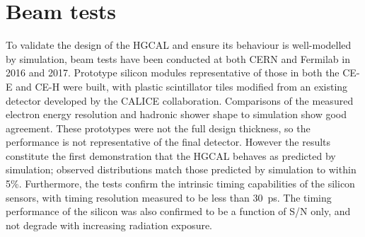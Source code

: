 \section{Beam tests}

To validate the design of the HGCAL and ensure its behaviour is well-modelled by simulation, beam tests have been conducted at both CERN and Fermilab in 2016 and 2017. 
Prototype silicon modules representative of those in both the CE-E and CE-H were built, with plastic scintillator tiles modified from an existing detector developed by the CALICE collaboration.
Comparisons of the measured electron energy resolution and hadronic shower shape to simulation show good agreement.
These prototypes were not the full design thickness, so the performance is not representative of the final detector.
However the results constitute the first demonstration that the HGCAL behaves as predicted by simulation; observed distributions match those predicted by simulation to within 5\%. 
Furthermore, the tests confirm the intrinsic timing capabilities of the silicon sensors, with timing resolution measured to be less than \SI{30}{\pico\second}.
The timing performance of the silicon was also confirmed to be a function of S/N only, and not degrade with increasing radiation exposure. 
